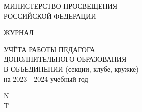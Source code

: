 

\thispagestyle{empty}
\begin{center}

 {\huge МИНИСТЕРСТВО ПРОСВЕЩЕНИЯ }
\\
{\huge  РОССИЙСКОЙ ФЕДЕРАЦИИ }

\vspace{50mm} %
{\huge  ЖУРНАЛ }
\vspace{30mm} %

{\huge УЧЁТА РАБОТЫ ПЕДАГОГА }
\\
\vspace{2mm} %
{\huge ДОПОЛНИТЕЛЬНОГО ОБРАЗОВАНИЯ }
\\
\vspace{2mm} %
{\huge  В ОБЪЕДИНЕНИИ (секции, клубе, кружке) }
\\
\vspace{2mm} %
{\huge  на 2023 - 2024 учебный год }

\vspace{50mm} %
{\huge N }
\\
\vspace{2mm} %
{\huge T }

\end{center}

\clearpage
\restoregeometry